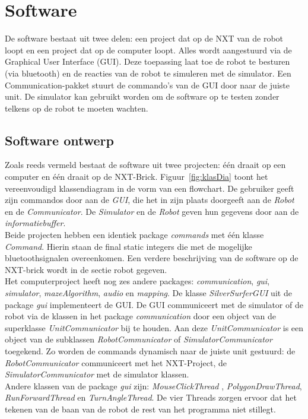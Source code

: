 \documentclass[tt3]{penoverslag}
\begin{document}
\section{Software} %
\label{sec:softw}
De software bestaat uit twee delen: een project dat op de NXT van de robot loopt en een project dat op de computer loopt. Alles wordt aangestuurd via de Graphical User Interface (GUI). Deze toepassing laat toe de robot te besturen (via bluetooth) en de reacties van de robot te simuleren met de simulator. Een Communication-pakket stuurt de commando's van de GUI door naar de juiste unit.
De simulator kan gebruikt worden om de software op te testen zonder telkens op de robot te moeten wachten.

\subsection{Software ontwerp} %
\label{ssec:Sdesign}
Zoals reeds vermeld bestaat de software uit twee projecten: \'e\'en draait op een computer en \'e\'en draait op de NXT-Brick. Figuur~\ref{fig:klasDia} toont het vereenvoudigd klassendiagram in de vorm van een flowchart. De gebruiker geeft zijn commandos door aan de \textit{GUI}, die het in zijn plaats doorgeeft aan de \textit{Robot} en de \textit{Communicator}. De \textit{Simulator} en de \textit{Robot} geven hun gegevens door aan de \textit{informatiebuffer}. \\
Beide projecten hebben een identiek package \textit{commands} met \'e\'en klasse \textit{Command}. Hierin staan de final static integers die met de mogelijke bluetoothsignalen overeenkomen. Een verdere beschrijving van de software op de NXT-brick wordt in de sectie robot gegeven.\\


Het computerproject heeft nog zes andere packages: \textit{communication}, \textit{gui}, \textit{simulator}, \textit{mazeAlgorithm}, \textit{audio} en \textit{mapping}. 
De klasse \textit{SilverSurferGUI} uit de package \textit{gui} implementeert de GUI. De GUI communiceert met de simulator of de robot via de klassen in het package \textit{communication} door een object van de superklasse \textit{UnitCommunicator} bij te houden. Aan deze \textit{UnitCommunicator} is een object van de subklassen \textit{RobotCommunicator} of \textit{SimulatorCommunicator}  toegekend. Zo worden de commands dynamisch naar de juiste unit gestuurd: de \textit{RobotCommunicator} communiceert met het NXT-Project, de \textit{SimulatorCommunicator} met de simulator klassen.\\
Andere klassen van de package \textit{gui} zijn: \textit{MouseClickThread} , \textit{PolygonDrawThread}, \textit{RunForwardThread} en \textit{TurnAngleThread}. De vier Threads zorgen ervoor dat het tekenen van de baan van de robot de rest van het programma niet stillegt. \\
\end{document}
